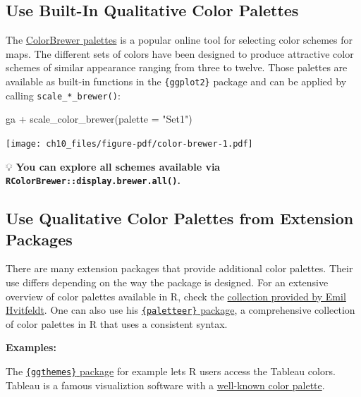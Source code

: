\documentclass[
  letterpaper,
  DIV=11,
  numbers=noendperiod]{scrreprt}
\newenvironment{Shaded}{\begin{snugshade}}{\end{snugshade}}
\newcommand{\AttributeTok}[1]{\textcolor[rgb]{0.40,0.45,0.13}{#1}}
\newcommand{\FunctionTok}[1]{\textcolor[rgb]{0.28,0.35,0.67}{#1}}
\newcommand{\NormalTok}[1]{\textcolor[rgb]{0.00,0.23,0.31}{#1}}
\newcommand{\SpecialCharTok}[1]{\textcolor[rgb]{0.37,0.37,0.37}{#1}}
\newcommand{\StringTok}[1]{\textcolor[rgb]{0.13,0.47,0.30}{#1}}
\begin{document}
\subsection{Use Built-In Qualitative Color
Palettes}\label{use-built-in-qualitative-color-palettes}

The \href{http://colorbrewer2.org/}{ColorBrewer palettes} is a popular
online tool for selecting color schemes for maps. The different sets of
colors have been designed to produce attractive color schemes of similar
appearance ranging from three to twelve. Those palettes are available as
built-in functions in the \texttt{\{ggplot2\}} package and can be
applied by calling \texttt{scale\_*\_brewer()}:

\begin{Shaded}
\begin{Highlighting}[]
\NormalTok{ga }\SpecialCharTok{+} \FunctionTok{scale\_color\_brewer}\NormalTok{(}\AttributeTok{palette =} \StringTok{"Set1"}\NormalTok{)}
\end{Highlighting}
\end{Shaded}

\texttt{[image: ch10\_files/figure-pdf/color-brewer-1.pdf]}

💡 \textbf{You can explore all schemes available via
\texttt{RColorBrewer::display.brewer.all()}.}

\subsection{Use Qualitative Color Palettes from Extension
Packages}\label{use-qualitative-color-palettes-from-extension-packages}

There are many extension packages that provide additional color
palettes. Their use differs depending on the way the package is
designed. For an extensive overview of color palettes available in R,
check the
\href{https://github.com/EmilHvitfeldt/r-color-palettes/blob/master/README.md\#comprehensive-list-of-color-palettes-in-r}{collection
provided by Emil Hvitfeldt}. One can also use his
\href{https://github.com/EmilHvitfeldt/paletteer}{\texttt{\{paletteer\}}
package}, a comprehensive collection of color palettes in R that uses a
consistent syntax.

\textbf{Examples:}

The \href{https://jrnold.github.io/ggthemes/}{\texttt{\{ggthemes\}}
package} for example lets R users access the Tableau colors. Tableau is
a famous visualiztion software with a
\href{http://www.tableau.com/de-de/about/blog/2016/7/colors-upgrade-tableau-10-56782}{well-known
color palette}.
\end{document}
